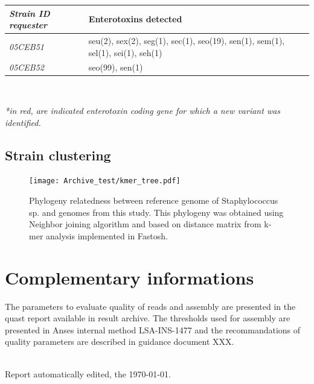 \documentclass[a4paper]{article}
\begin{document}
{\renewcommand{\arraystretch}{1.5} %
{\setlength{\tabcolsep}{1cm} %
\centering
\begin{tabular}{|p{2cm}|p{8cm}|}
  \hline
  \textbf{\textit{Strain ID requester}} & \textbf{Enterotoxins detected} \\
  \hline
  \textit{05CEB51} & seu(2), sex(2), seg(1), sec(1), seo(19), sen(1), sem(1), sel(1), sei(1), seh(1) \\%
  \textit{05CEB52} & {\color{red} seo(99)}, sen(1) \\%
  \hline
\end{tabular}\\
}}

\small \textit{*in red, are indicated enterotoxin coding gene for which a new variant was identified.}


\clearpage

\subsection{Strain clustering}

\begin{figure}[H]
\begin{center}
 \texttt{[image: Archive\_test/kmer\_tree.pdf]} %
\end{center}
\caption{Phylogeny relatedness between reference genome of Staphylococcus sp. and genomes from this study. This phylogeny was obtained using Neighbor joining algorithm and based on distance matrix from k-mer analysis implemented in Fastosh.}
\end{figure}

 

\section{Complementary informations}

The parameters to evaluate quality of reads and assembly are presented in the quast report available in result archive. The thresholds used for assembly are presented in Anses internal method LSA-INS-1477 and the recommandations of quality parameters are described in guidance document XXX.\\\\

\begin{flushright}
{Report automatically edited, the \today.}
\end{flushright}
\end{document}
